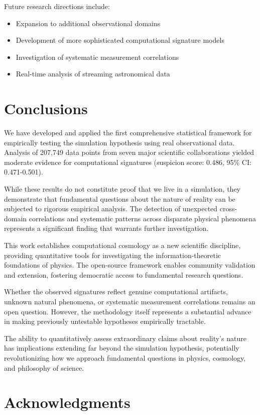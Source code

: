 \documentclass[12pt,a4paper]{article}
\begin{document}
Future research directions include:
\begin{itemize}
\item Expansion to additional observational domains
\item Development of more sophisticated computational signature models
\item Investigation of systematic measurement correlations
\item Real-time analysis of streaming astronomical data
\end{itemize}

\section{Conclusions}

We have developed and applied the first comprehensive statistical framework for empirically testing the simulation hypothesis using real observational data. Analysis of 207,749 data points from seven major scientific collaborations yielded moderate evidence for computational signatures (suspicion score: 0.486, 95\% CI: 0.471-0.501).

While these results do not constitute proof that we live in a simulation, they demonstrate that fundamental questions about the nature of reality can be subjected to rigorous empirical analysis. The detection of unexpected cross-domain correlations and systematic patterns across disparate physical phenomena represents a significant finding that warrants further investigation.

This work establishes computational cosmology as a new scientific discipline, providing quantitative tools for investigating the information-theoretic foundations of physics. The open-source framework enables community validation and extension, fostering democratic access to fundamental research questions.

Whether the observed signatures reflect genuine computational artifacts, unknown natural phenomena, or systematic measurement correlations remains an open question. However, the methodology itself represents a substantial advance in making previously untestable hypotheses empirically tractable.

The ability to quantitatively assess extraordinary claims about reality's nature has implications extending far beyond the simulation hypothesis, potentially revolutionizing how we approach fundamental questions in physics, cosmology, and philosophy of science.

\section*{Acknowledgments}
\end{document}
